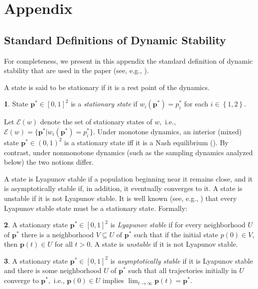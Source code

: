 \documentclass[12pt]{article}
\numberwithin{equation}{section}
\numberwithin{figure}{section}
\theoremstyle{definition}
\newtheorem{defn}{\protect\definitionname}
\theoremstyle{plain}
\theoremstyle{plain}
\theoremstyle{plain}
\theoremstyle{remark}
\theoremstyle{plain}
\theoremstyle{plain}
\providecommand{\definitionname}{Definition}
\begin{document}
\appendix

\section{Appendix\label{sec:Technical-Proofs}}
\subsection{Standard Definitions of Dynamic Stability}\label{sub-standard-definitions}
For completeness, we present in this appendix  the standard definition of dynamic stability that are used in the paper (see, e.g., \citealp[Chapter 5]{weibull1997evolutionary}).

A state is said to be 
stationary if
it is a rest point of the dynamics.
\begin{defn}
\label{def:equilbirium}State $\mathbf{p}^{*}\in\left[0,1\right]^{2}$
is a \emph{stationary state}
if $w_{i}\left(\mathbf{p}^{*}\right)=p_{i}^{*}$
for each $i\in\left\{ 1,2\right\}$.
\end{defn}
Let $\mathcal{E}\left(w\right)$ denote the set of stationary states of $w,$ i.e., $\mathcal{E}\left(w\right) = \{\mathbf{p}^{*} | w_{i}\left(\mathbf{p}^{*}\right)=p_{i}^{*}\}.$ Under monotone dynamics,  an interior (mixed) state $\mathbf{p}^*\in (0,1)^2$ is a stationary state iff it is a Nash equilibrium (\citealp[Prop. 4.7]{weibull1997evolutionary}). By contrast, under nonmonotone dynamics (such as the sampling dynamics analyzed below) the two notions differ.

A state is Lyapunov stable if a population beginning near it remains close, and it is asymptotically stable if, in addition, it eventually converges to it. A state is
unstable if it is not Lyapunov stable. It is well known (see, e.g., \citealp[Section 6.4]{weibull1997evolutionary})
that every Lyapunov stable state must be a stationary state. Formally:

\begin{defn}
\label{def:lyaponouv-stability} A stationary state $\mathbf{p}^{*}\in\left[0,1\right]^{2}$
is \emph{Lyapunov stable} if for every neighborhood $U$ of $\mathbf{p}^{*}$
there is a neighborhood $V\subseteq U$ of $\mathbf{p}^{*}$ such that if the
initial state $p\left(0\right)\in V$, then $\mathbf{p}\left(t\right)\in U$
for all $t>0$. A state is \emph{unstable} if it is not
Lyapunov stable.
\end{defn}

\begin{defn}
A stationary state $\mathbf{p}^{*}\in\left[0,1\right]^{2}$
is \emph{asymptotically stable} if it is Lyapunov stable and there is some neighborhood $U$
of $\mathbf{p}^{*}$ such that all trajectories initially in $U$ converge
to $\mathbf{p}^{*},$ i.e., $\mathbf{p}\left(0\right)\in U$ implies $\lim_{t\rightarrow\infty}\mathbf{p}\left(t\right)=\mathbf{p}^{*}$.
\end{defn}
\end{document}
